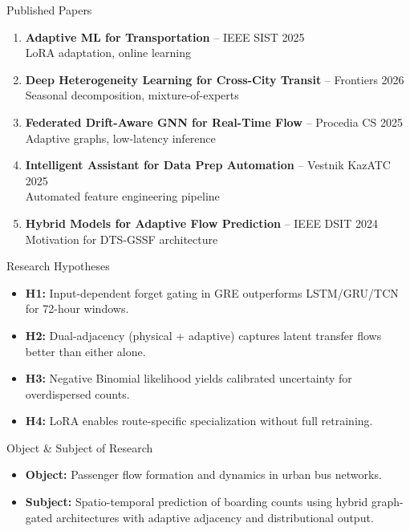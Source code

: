 \documentclass[aspectratio=169, 11pt]{beamer}
\begin{document}
\begin{frame}{Published Papers}
  \begin{enumerate}
    \item \textbf{Adaptive ML for Transportation} -- IEEE SIST 2025\\
      {\small LoRA adaptation, online learning}
    \item \textbf{Deep Heterogeneity Learning for Cross-City Transit} -- Frontiers 2026\\
      {\small Seasonal decomposition, mixture-of-experts}
    \item \textbf{Federated Drift-Aware GNN for Real-Time Flow} -- Procedia CS 2025\\
      {\small Adaptive graphs, low-latency inference}
    \item \textbf{Intelligent Assistant for Data Prep Automation} -- Vestnik KazATC 2025\\
      {\small Automated feature engineering pipeline}
    \item \textbf{Hybrid Models for Adaptive Flow Prediction} -- IEEE DSIT 2024\\
      {\small Motivation for DTS-GSSF architecture}
  \end{enumerate}
\end{frame}

\begin{frame}{Research Hypotheses}
  \begin{itemize}
    \item \textbf{H1:} Input-dependent forget gating in GRE outperforms LSTM/GRU/TCN for \textcolor{accent}{72-hour windows}.
    \item \textbf{H2:} Dual-adjacency (physical + adaptive) captures \textcolor{accent}{latent transfer flows} better than either alone.
    \item \textbf{H3:} Negative Binomial likelihood yields \textcolor{accent}{calibrated uncertainty} for overdispersed counts.
    \item \textbf{H4:} LoRA enables \textcolor{accent}{route-specific specialization} without full retraining.
  \end{itemize}
\end{frame}

\begin{frame}{Object \& Subject of Research}
  \begin{itemize}
    \item \textbf{Object:} Passenger flow formation and dynamics in urban bus networks.
    \item \textbf{Subject:} Spatio-temporal prediction of boarding counts using hybrid graph-gated architectures with \textcolor{accent}{adaptive adjacency} and \textcolor{accent}{distributional output}.
  \end{itemize}
\end{frame}
\end{document}
